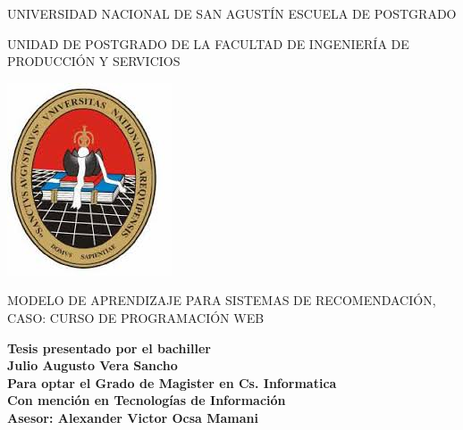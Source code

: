 \begin{titlepage}
\pagestyle{empty}


\begin{center}

\fontsize{20pt}{20pt} \selectfont UNIVERSIDAD NACIONAL DE SAN AGUSTÍN 
ESCUELA DE POSTGRADO

\vspace*{1cm}
\begin{center}
{\Large UNIDAD DE POSTGRADO DE LA FACULTAD DE INGENIERÍA 
DE PRODUCCIÓN Y SERVICIOS}
\end{center}
\vspace*{1cm}


\begin{center}
      
    
      \includegraphics[scale=0.7]{imagenes/unsaescudo.jpg}\\ 
\end{center}
      

\vspace*{1cm}
\begin{center}
{\Large MODELO DE APRENDIZAJE PARA SISTEMAS DE RECOMENDACIÓN, CASO: CURSO DE PROGRAMACIÓN WEB }



\end{center}

\vspace*{1.5cm}

\begin{flushright}

\small \textbf{Tesis presentado por el bachiller\\
Julio Augusto Vera Sancho\\
Para optar el Grado de Magister en Cs. Informatica\\
Con mención en Tecnologías de Información\\
Asesor: Alexander Victor Ocsa Mamani}


\end{flushright}
\end{center}
\end{titlepage}
